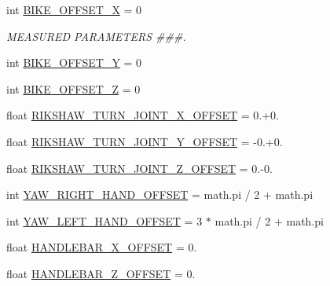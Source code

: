 \begin{DoxyCompactItemize}
\item 
int \mbox{\hyperlink{namespacesteering__trajectory__following__test_a130062548b68d0794e4296549fc1a8e1}{B\+I\+K\+E\+\_\+\+O\+F\+F\+S\+E\+T\+\_\+X}} = 0
\begin{DoxyCompactList}\small\item\em M\+E\+A\+S\+U\+R\+ED P\+A\+R\+A\+M\+E\+T\+E\+RS \#\#\#. \end{DoxyCompactList}\item 
int \mbox{\hyperlink{namespacesteering__trajectory__following__test_ac4bd8b57aab5072e7e6468ccb6f4ecbd}{B\+I\+K\+E\+\_\+\+O\+F\+F\+S\+E\+T\+\_\+Y}} = 0
\item 
int \mbox{\hyperlink{namespacesteering__trajectory__following__test_a8e900f2349a00e740da3d6ee884c18b9}{B\+I\+K\+E\+\_\+\+O\+F\+F\+S\+E\+T\+\_\+Z}} = 0
\item 
float \mbox{\hyperlink{namespacesteering__trajectory__following__test_a004b0c34aea2307ae6445ecd4279d401}{R\+I\+K\+S\+H\+A\+W\+\_\+\+T\+U\+R\+N\+\_\+\+J\+O\+I\+N\+T\+\_\+\+X\+\_\+\+O\+F\+F\+S\+ET}} = 0.+0.
\item 
float \mbox{\hyperlink{namespacesteering__trajectory__following__test_ae18e7d3e16b872bcc8bf62cb263a109e}{R\+I\+K\+S\+H\+A\+W\+\_\+\+T\+U\+R\+N\+\_\+\+J\+O\+I\+N\+T\+\_\+\+Y\+\_\+\+O\+F\+F\+S\+ET}} = -\/0.+0.
\item 
float \mbox{\hyperlink{namespacesteering__trajectory__following__test_aaafe07ee8e5a288632dc7bcd5c29f91e}{R\+I\+K\+S\+H\+A\+W\+\_\+\+T\+U\+R\+N\+\_\+\+J\+O\+I\+N\+T\+\_\+\+Z\+\_\+\+O\+F\+F\+S\+ET}} = 0.-\/0.
\item 
int \mbox{\hyperlink{namespacesteering__trajectory__following__test_a0f1fc685145b73065e03bc8d450e7c44}{Y\+A\+W\+\_\+\+R\+I\+G\+H\+T\+\_\+\+H\+A\+N\+D\+\_\+\+O\+F\+F\+S\+ET}} = math.\+pi / 2 + math.\+pi
\item 
int \mbox{\hyperlink{namespacesteering__trajectory__following__test_a8fc58cbdf64094b4d9cc2e0bb3319825}{Y\+A\+W\+\_\+\+L\+E\+F\+T\+\_\+\+H\+A\+N\+D\+\_\+\+O\+F\+F\+S\+ET}} = 3 $\ast$ math.\+pi / 2 + math.\+pi
\item 
float \mbox{\hyperlink{namespacesteering__trajectory__following__test_a6ba20e809d4f5b3820ac8afb19bf90d8}{H\+A\+N\+D\+L\+E\+B\+A\+R\+\_\+\+X\+\_\+\+O\+F\+F\+S\+ET}} = 0.
\item 
float \mbox{\hyperlink{namespacesteering__trajectory__following__test_a1b352cfed7d4963785bf84372c1072ee}{H\+A\+N\+D\+L\+E\+B\+A\+R\+\_\+\+Z\+\_\+\+O\+F\+F\+S\+ET}} = 0.

\end{DoxyCompactItemize}
